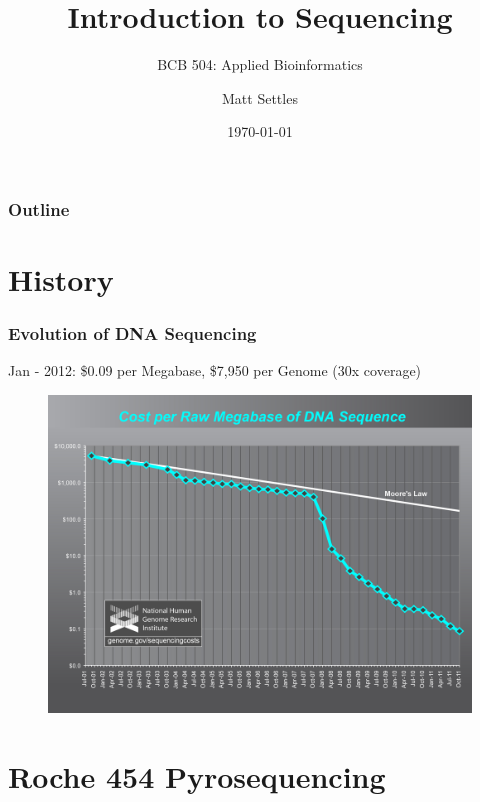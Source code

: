 \documentclass[pdf]{beamer}
\begin{document}
\title[Introduction to Sequencing]{Introduction to Sequencing}
\subtitle{BCB 504: Applied Bioinformatics\\}
\author[Matt Settles]{Matt Settles}
\date{\today}


\begin{frame}[plain]
  \titlepage
\end{frame}


\begin{frame}[plain] 
  \frametitle{Outline}
  \tableofcontents
\end{frame}

\section{History}
\begin{frame}
  \frametitle{Evolution of DNA Sequencing}
  {\footnotesize Jan - 2012: \$0.09 per Megabase, \$7,950 per Genome (30x coverage)}
  \begin{center}
  \begin{figure}
    \includegraphics[scale=0.4]{cost_per_megabase.jpg}
  \end{figure}
  \end{center}
\end{frame}

\section{Roche 454 Pyrosequencing}
\end{document}
